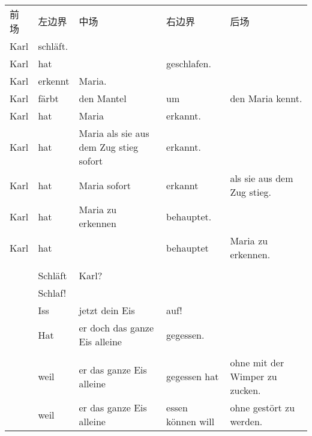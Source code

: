 %
\begin{table}
\begin{sideways}
\begin{tabular}{lllll}
前场 & 左边界 & 中场                                      & 右边界& 后场                   \\\lsptoprule
Karl    & schläft.                                                                                            \\
Karl    & hat           &                                        & geschlafen.                                 \\
Karl    & erkennt       & Maria.                                                                               \\
Karl    & färbt         & den Mantel                             & um             & den Maria kennt.           \\
Karl    & hat           & Maria                                  & erkannt.                                    \\
Karl    & hat           & Maria als sie aus dem Zug stieg sofort & erkannt.                                    \\
Karl    & hat           & Maria sofort                           & erkannt        & als sie aus dem Zug stieg. \\
Karl    & hat           & Maria zu erkennen                      & behauptet.                                  \\
Karl    & hat           &                                        & behauptet      & Maria zu erkennen.         \\ \\
        & Schläft       & Karl?                                                                                \\
        & Schlaf!                                                                                              \\
        & Iss           & jetzt dein Eis                         & auf!                                        \\
        & Hat           & er doch das ganze Eis alleine          & gegessen.                                   \\  \\
        & weil          & er das ganze Eis alleine               & gegessen hat   & ohne mit der Wimper zu zucken.    \\
        & weil          & er das ganze Eis alleine               & essen können will   & ohne gestört zu werden.    \\

\end{tabular}
\end{sideways}
\end{table}
